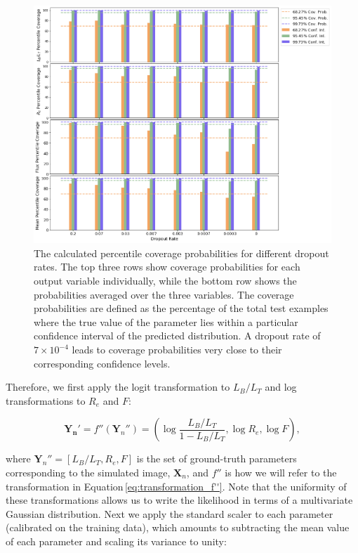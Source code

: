 \documentclass[twocolumn]{aastex63}
\begin{document}
\begin{CJK*}{UTF8}{gbsn}
\begin{figure}[htb]
    \centering
    \includegraphics[width
    =\textwidth]{dropout_calibration_new.png}
    \caption{The calculated percentile coverage probabilities for different dropout rates. The top three rows show coverage probabilities for each output variable individually, while the bottom row shows the probabilities averaged over the three variables. The coverage probabilities are defined as the percentage of the total test examples where the  true  value  of  the  parameter  lies  within  a  particular confidence interval of the predicted distribution. A dropout rate of $7\times10^{-4}$ leads to coverage probabilities very close to their corresponding confidence levels.}
    \label{fig:dropout_calibration}
\end{figure}

Therefore, we first apply the logit transformation to $L_B/L_T$ and log transformations to $R_e$ and $F$: 

\begin{equation}
\boldsymbol{Y_n'} = f''(\boldsymbol{Y}_n'') = \left( \log \frac{L_B/L_T}{1 - L_B/L_T}, \log R_e, \log F \right) ,
\label{eq:transformation_f''}
\end{equation} 

\noindent
where $\boldsymbol{Y}_n'' = [{L_B/L_T,R_e,F}]$ is the set of ground-truth parameters corresponding to the simulated image, $\boldsymbol{X}_n$, and $f''$ is how we will refer to the transformation in Equation\,\ref{eq:transformation_f''}. Note that the uniformity of these transformations allows us to write the likelihood in terms of a multivariate Gaussian distribution. Next we apply the standard scaler to each parameter (calibrated on the training data), which amounts to subtracting the mean value of each parameter and scaling its variance to unity:


\end{CJK*}
\end{document}

